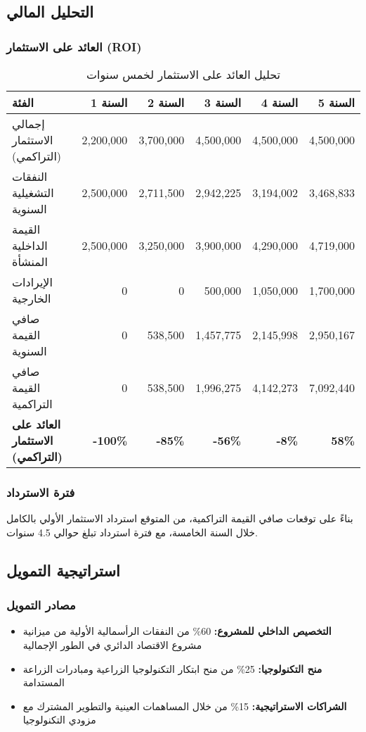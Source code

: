 \subsection{التحليل المالي}

\subsubsection{العائد على الاستثمار (ROI)}
\begin{table}[H]
\centering
\begin{tabular}{lrrrrr}
\toprule
\textbf{الفئة} & \textbf{السنة 1} & \textbf{السنة 2} & \textbf{السنة 3} & \textbf{السنة 4} & \textbf{السنة 5} \\
\midrule
إجمالي الاستثمار (التراكمي) & 2,200,000 & 3,700,000 & 4,500,000 & 4,500,000 & 4,500,000 \\
النفقات التشغيلية السنوية & 2,500,000 & 2,711,500 & 2,942,225 & 3,194,002 & 3,468,833 \\
القيمة الداخلية المنشأة & 2,500,000 & 3,250,000 & 3,900,000 & 4,290,000 & 4,719,000 \\
الإيرادات الخارجية & 0 & 0 & 500,000 & 1,050,000 & 1,700,000 \\
صافي القيمة السنوية & 0 & 538,500 & 1,457,775 & 2,145,998 & 2,950,167 \\
صافي القيمة التراكمية & 0 & 538,500 & 1,996,275 & 4,142,273 & 7,092,440 \\
\midrule
\textbf{العائد على الاستثمار (التراكمي)} & \textbf{-100\%} & \textbf{-85\%} & \textbf{-56\%} & \textbf{-8\%} & \textbf{58\%} \\
\bottomrule
\end{tabular}
\caption{تحليل العائد على الاستثمار لخمس سنوات}
\end{table}

\subsubsection{فترة الاسترداد}
بناءً على توقعات صافي القيمة التراكمية، من المتوقع استرداد الاستثمار الأولي بالكامل خلال السنة الخامسة، مع فترة استرداد تبلغ حوالي 4.5 سنوات.

\subsection{استراتيجية التمويل}

\subsubsection{مصادر التمويل}
\begin{itemize}
    \item \textbf{التخصيص الداخلي للمشروع:} 60\% من النفقات الرأسمالية الأولية من ميزانية مشروع الاقتصاد الدائري في الطور الإجمالية
    
    \item \textbf{منح التكنولوجيا:} 25\% من منح ابتكار التكنولوجيا الزراعية ومبادرات الزراعة المستدامة
    
    \item \textbf{الشراكات الاستراتيجية:} 15\% من خلال المساهمات العينية والتطوير المشترك مع مزودي التكنولوجيا
\end{itemize}

